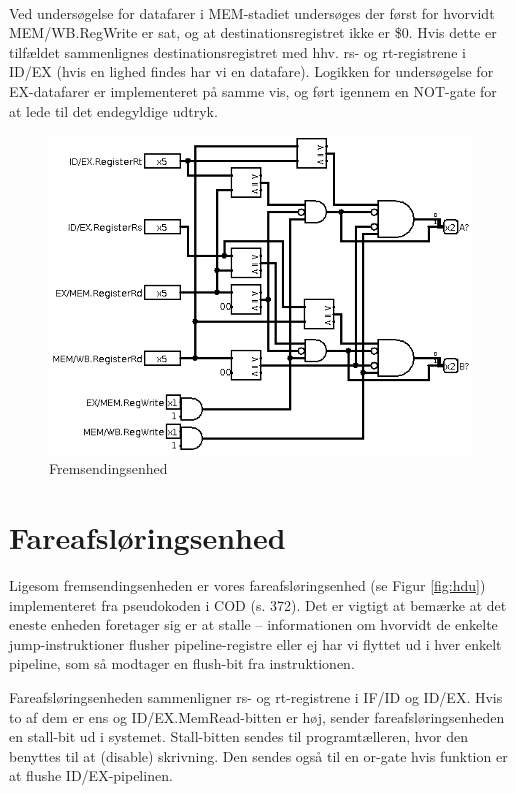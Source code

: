 \documentclass[10pt,a4paper,danish]{article}
\begin{document}
\paragraph{}
Ved undersøgelse for datafarer i MEM-stadiet undersøges der først 
for hvorvidt MEM/WB.RegWrite er sat, og at destinationsregistret
ikke er \$0. Hvis dette er tilfældet sammenlignes destinationsregistret
med hhv. rs- og rt-registrene i ID/EX (hvis en lighed findes har vi en 
datafare). Logikken for undersøgelse for EX-datafarer er implementeret
på samme vis, og ført igennem en NOT-gate for at lede til det endegyldige
udtryk. 

\begin{figure}[htb]
\begin{center}
\leavevmode
\includegraphics[width=1\textwidth]{forwarding_unit.png}
\end{center}
\caption{Fremsendingsenhed}
\label{fig:fu}
\end{figure}

\section{Fareafsløringsenhed}
Ligesom fremsendingsenheden er vores fareafsløringsenhed (se Figur \ref{fig:hdu})
implementeret fra pseudokoden i COD (s. 372). Det er vigtigt at bemærke at 
det eneste enheden foretager sig er at stalle -- informationen om hvorvidt de 
enkelte jump-instruktioner flusher pipeline-registre eller ej har vi flyttet
ud i hver enkelt pipeline, som så modtager en flush-bit fra instruktionen. 

Fareafsløringsenheden sammenligner rs- og rt-registrene i IF/ID og ID/EX. Hvis
to af dem er ens og ID/EX.MemRead-bitten er høj, sender fareafsløringsenheden
en stall-bit ud i systemet. Stall-bitten sendes til programtælleren, hvor den 
benyttes til at (disable) skrivning. Den sendes også til en or-gate hvis 
funktion er at flushe ID/EX-pipelinen. 
\end{document}
